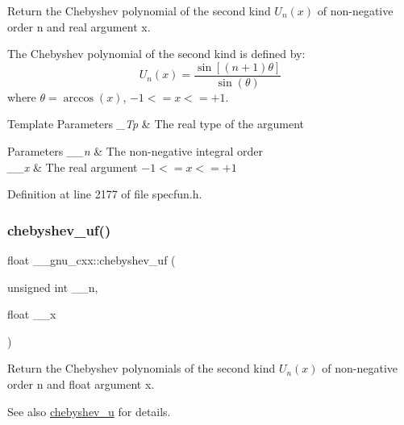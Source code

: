 Return the Chebyshev polynomial of the second kind $ U_n(x) $ of non-\/negative order {\ttfamily n} and real argument {\ttfamily x}.

The Chebyshev polynomial of the second kind is defined by\+: \[ U_n(x) = \frac{\sin \left[(n+1)\theta \right]}{\sin(\theta)} \] where $ \theta = \arccos(x) $, $ -1 <= x <= +1 $.


\begin{DoxyTemplParams}{Template Parameters}
{\em \+\_\+\+Tp} & The real type of the argument \\
\hline
\end{DoxyTemplParams}

\begin{DoxyParams}{Parameters}
{\em \+\_\+\+\_\+n} & The non-\/negative integral order \\
\hline
{\em \+\_\+\+\_\+x} & The real argument $ -1 <= x <= +1 $ \\
\hline
\end{DoxyParams}


Definition at line 2177 of file specfun.\+h.

\mbox{\label{group__mathsf__gnu_ga4b28c2a079eae2e9612c9902801ca256}} 
\subsubsection{\texorpdfstring{chebyshev\+\_\+uf()}{chebyshev\_uf()}}
{\footnotesize\ttfamily float \+\_\+\+\_\+gnu\+\_\+cxx\+::chebyshev\+\_\+uf (\begin{DoxyParamCaption}\item[{unsigned int}]{\+\_\+\+\_\+n,  }\item[{float}]{\+\_\+\+\_\+x }\end{DoxyParamCaption})\hspace{0.3cm}{\ttfamily [inline]}}

Return the Chebyshev polynomials of the second kind $ U_n(x) $ of non-\/negative order {\ttfamily n} and {\ttfamily float} argument {\ttfamily x}.

\begin{DoxySeeAlso}{See also}
\hyperlink{group__mathsf__gnu_gafa90c06bdedb8459f20576297cf1608f}{chebyshev\+\_\+u} for details. 
\end{DoxySeeAlso}


